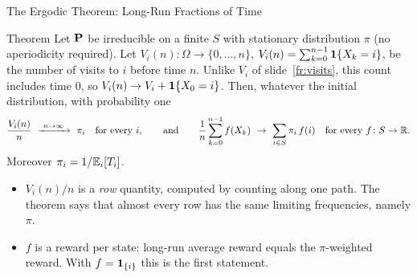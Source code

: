 \begin{frame}{The Ergodic Theorem: Long-Run Fractions of Time}
  \label{fr:ergodic}
  \small
  \begin{block}{Theorem}
    Let $\mathbf{P}$ be irreducible on a finite $S$ with stationary distribution $\pi$ (no aperiodicity required). Let $V_i(n)\colon\Omega\to\{0,\dots,n\}$, $V_i(n)=\sum_{k=0}^{n-1}\mathbf{1}\{X_k=i\}$, be the number of visits to $i$ before time $n$. Unlike $V_i$ of slide~\ref{fr:visits}, this count includes time $0$, so $V_i(n)\to V_i+\mathbf{1}\{X_0=i\}$. Then, whatever the initial distribution, with probability one
    \[
      \frac{V_i(n)}{n}\ \xrightarrow{\ n\to\infty\ }\ \pi_i\quad\text{for every } i,
      \qquad\text{and}\qquad
      \frac1n\sum_{k=0}^{n-1}f(X_k)\ \to\ \sum_{i\in S}\pi_i\,f(i)\quad\text{for every } f\colon S\to\R .
    \]
    Moreover $\pi_i=1/\mathbb{E}_i[T_i]$.
  \end{block}
  \begin{itemize}
    \item $V_i(n)/n$ is a \emph{row} quantity, computed by counting along one path. The theorem says that almost every row has the same limiting frequencies, namely $\pi$.
    \item $f$ is a reward per state: long-run average reward equals the $\pi$-weighted reward. With $f=\mathbf{1}_{\{i\}}$ this is the first statement.
  \end{itemize}
\end{frame}

